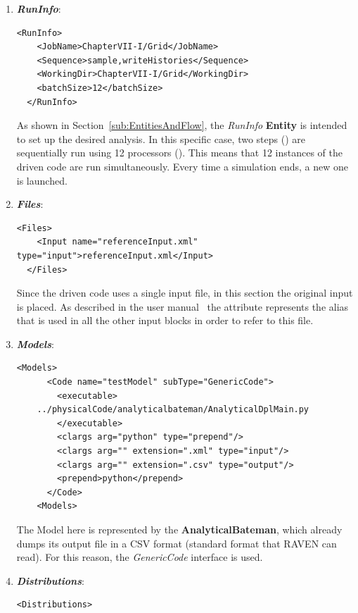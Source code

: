\begin{enumerate}
   \item \textbf{\textit{RunInfo}}:
\begin{lstlisting}[style=XML,morekeywords={arg,extension,pauseAtEnd,overwrite}]
  <RunInfo>
    <JobName>ChapterVII-I/Grid</JobName>
    <Sequence>sample,writeHistories</Sequence>
    <WorkingDir>ChapterVII-I/Grid</WorkingDir>
    <batchSize>12</batchSize>
  </RunInfo>
\end{lstlisting}   
   As shown in Section~\ref{sub:EntitiesAndFlow}, the \textit{RunInfo} \textbf{Entity} is intended to set up the desired analysis.
   In this specific case, two steps () are sequentially run 
   using 12 processors (). This means that
   12 instances of the driven code are  run simultaneously. 
   Every time a simulation ends, a new one is launched.
   \item \textbf{\textit{Files}}:
\begin{lstlisting}[style=XML,morekeywords={arg,extension,pauseAtEnd,overwrite}]
  <Files>
    <Input name="referenceInput.xml" type="input">referenceInput.xml</Input>
  </Files>
\end{lstlisting}
   Since the driven code uses a single input file, in this section the original input is placed. As described in the user manual~\cite{RAVENuserManual}
   the attribute   represents the alias that is used in all the other input blocks in order to refer to this file.
   \item \textbf{\textit{Models}}:
\begin{lstlisting}[style=XML,morekeywords={arg,extension,pauseAtEnd,overwrite}]
   <Models>
      <Code name="testModel" subType="GenericCode">
        <executable>
    ../physicalCode/analyticalbateman/AnalyticalDplMain.py
        </executable>
        <clargs arg="python" type="prepend"/>
        <clargs arg="" extension=".xml" type="input"/>
        <clargs arg="" extension=".csv" type="output"/>
        <prepend>python</prepend>
      </Code>
    <Models>
\end{lstlisting}
 The Model here is represented by the 
 \textbf{AnalyticalBateman}, which already dumps its output file in a 
 CSV format (standard format that RAVEN can read). For this reason,
 the \textit{GenericCode} interface is used.
   \item \textbf{\textit{Distributions}}:
\begin{lstlisting}[style=XML,morekeywords={arg,extension,pauseAtEnd,overwrite}]
  <Distributions>

\end{lstlisting}
\end{enumerate}
